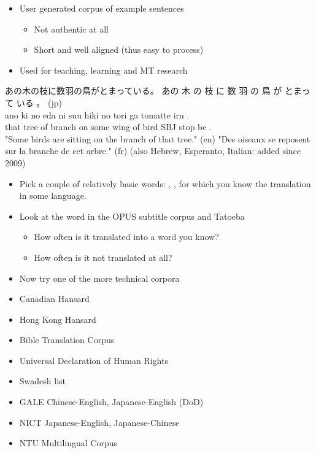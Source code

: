 \documentclass[a4paper,landscape,headrule,footrule,xetex]{foils}
\begin{document}
\begin{itemize}
\item User generated corpus of example sentences
  \begin{itemize}
  \item Not authentic at all
  \item Short and well aligned (thus easy to process)
  \end{itemize}
\item Used for teaching, learning and MT research 
\end{itemize}
\CJKnospace\makexeCJKactive
\begin{exe} \small
  \ex \label{7836}
  
あの木の枝に数羽の鳥がとまっている。
\glll あの 木 の 枝 に 数 羽 の 鳥 が とまって いる 。 (jp)\\
 ano ki no eda ni suu hiki no tori ga tomatte iru . \\
 that tree of branch on some wing of bird SBJ stop be . \\
\trans "Some birds are sitting on the branch of that tree." (en)
\trans "Des oiseaux se reposent sur la branche de cet arbre." (fr)
\trans (also Hebrew, Esperanto, Italian: added since 2009)
\end{exe}
\makexeCJKinactive
{}
\begin{itemize}
\item Pick a couple of relatively basic words: , , 
  for which you know the translation in some language.
\item Look at the word in the OPUS subtitle corpus and Tatoeba
  \begin{itemize}
  \item How often is it translated into a word you know?
  \item How often is it not translated at all?
  \end{itemize}
\item Now try one of the more technical corpora

\end{itemize}



\begin{itemize}
\item Canadian Hansard
\item Hong Kong Hansard
\item Bible Translation Corpus
\item Universal Declaration of Human Rights
\item Swadesh list
\item GALE Chinese-English, Japanese-English (DoD)
\item NICT Japanese-English, Japanese-Chinese
\item NTU Multilingual Corpus
\end{itemize}
\end{document}
